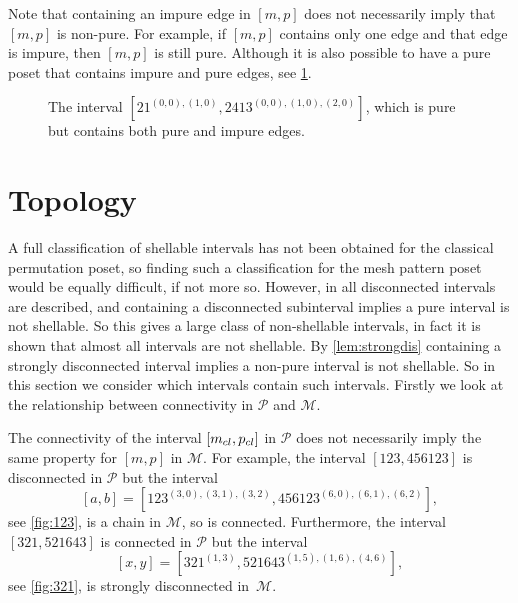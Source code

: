 \documentclass[11pt,a4paper,oneside]{article}
\begin{document}
Note that containing an impure edge in $[m,p]$ does not necessarily imply
that $[m,p]$ is non-pure. For example, if $[m,p]$ contains only one edge and
that edge is impure, then $[m,p]$ is still pure. Although it is also possible
to have a pure poset that contains impure and pure edges, see \cref{fig:pureIm}.

\begin{figure}\centering
{}
\caption{The interval $[21^{(0,0),(1,0)},2413^{(0,0),(1,0),(2,0)}]$,
 which is pure but contains both pure and impure edges.}
 \label{fig:pureIm}
\end{figure}

\section{Topology}\label{sec:topology}
A full classification of shellable intervals has not been obtained for the classical permutation
poset, so finding such a classification for the mesh pattern poset would be equally difficult, if not more so.
However, in \cite{McSt13} all disconnected intervals are described, and containing a disconnected subinterval
implies a pure interval is not shellable. So this gives a large class of non-shellable intervals, in fact
it is shown that almost all intervals are not shellable. By \cref{lem:strongdis} containing a strongly
disconnected interval implies a non-pure interval is not shellable. So in this section we consider 
which intervals contain such intervals. Firstly we look at the relationship between connectivity
in $\mathcal{P}$ and $\mathcal{M}$.

The connectivity of the interval $[m_{cl},p_{cl}]$ in $\mathcal{P}$ does
not necessarily imply the same property for $[m,p]$ in $\mathcal{M}$.
For example, the interval $[123,456123]$ is disconnected in $\mathcal{P}$ but the
interval $$[a,b]=[123^{(3,0),(3,1),(3,2)},456123^{(6,0),(6,1),(6,2)}],$$ see
\cref{fig:123}, is a chain in $\mathcal{M}$, so is connected. Furthermore, the interval
$[321,521643]$ is connected in $\mathcal{P}$ but the interval 
$$[x,y]=[321^{(1, 3)},521643^{(1, 5),(1, 6), (4, 6)}],$$ see \cref{fig:321}, is strongly
disconnected in~$\mathcal{M}$.
\end{document}

